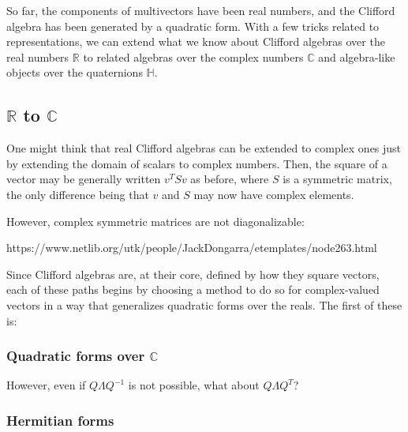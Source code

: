 \documentclass{article}
\begin{document}
So far, the components of multivectors have been real numbers,
and the Clifford algebra has been generated by a quadratic form.
With a few tricks related to representations, we can extend what we know
about Clifford algebras over the real numbers $\mathbb{R}$
to related algebras over the complex numbers $\mathbb{C}$
and algebra-like objects over the quaternions $\mathbb{H}$.

\subsection{\texorpdfstring{$\mathbb{R}$}{R} to \texorpdfstring{$\mathbb{C}$}{C}}

One might think that real Clifford algebras can be extended to complex ones
just by extending the domain of scalars to complex numbers.
Then, the square of a vector may be generally written $v^TSv$ as before,
where $S$ is a symmetric matrix,
the only difference being that $v$ and $S$ may now have complex elements.

However, complex symmetric matrices are not diagonalizable:

https://www.netlib.org/utk/people/JackDongarra/etemplates/node263.html

Since Clifford algebras are, at their core, defined by how they square vectors,
each of these paths begins by choosing a method to do so for complex-valued vectors
in a way that generalizes quadratic forms over the reals.
The first of these is:

\subsubsection{Quadratic forms over \texorpdfstring{$\mathbb{C}$}{C}}

However, even if $Q \Lambda Q^{-1}$ is not possible,
what about $Q \Lambda Q^T$?

\subsubsection{Hermitian forms}
\end{document}
